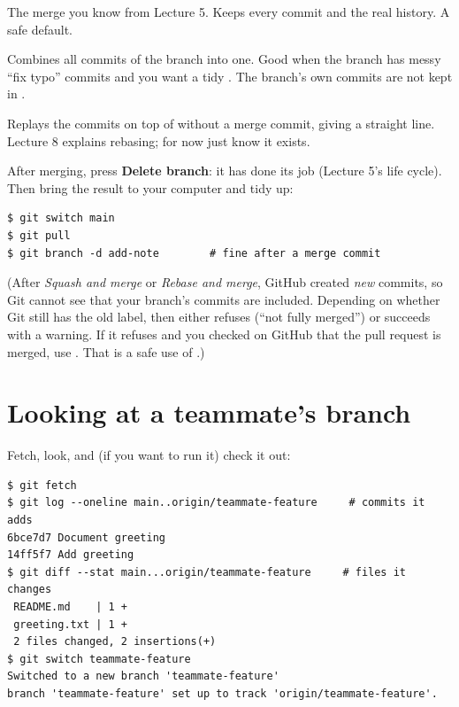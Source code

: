 \begin{description}[leftmargin=1.2em,style=nextline]
\item[Create a merge commit] The merge you know from Lecture 5. Keeps every commit and the real history. A safe default.
\item[Squash and merge] Combines all commits of the branch into one. Good when the branch has messy ``fix typo'' commits and you want a tidy . The branch's own commits are not kept in .
\item[Rebase and merge] Replays the commits on top of  without a merge commit, giving a straight line. Lecture 8 explains rebasing; for now just know it exists.
\end{description}

After merging, press \textbf{Delete branch}: it has done its job (Lecture 5's life cycle). Then bring the result to your computer and tidy up:

\begin{lstlisting}
$ git switch main
$ git pull
$ git branch -d add-note        # fine after a merge commit
\end{lstlisting}

(After \emph{Squash and merge} or \emph{Rebase and merge}, GitHub created \emph{new} commits, so Git cannot see that your branch's commits are included. Depending on whether Git still has the old  label,  then either refuses (``not fully merged'') or succeeds with a warning. If it refuses and you checked on GitHub that the pull request is merged, use . That is a safe use of .)

\section{Looking at a teammate's branch}\label{sec:teammate}

Fetch, look, and (if you want to run it) check it out:

\begin{lstlisting}
$ git fetch
$ git log --oneline main..origin/teammate-feature     # commits it adds
6bce7d7 Document greeting
14ff5f7 Add greeting
$ git diff --stat main...origin/teammate-feature     # files it changes
 README.md    | 1 +
 greeting.txt | 1 +
 2 files changed, 2 insertions(+)
$ git switch teammate-feature
Switched to a new branch 'teammate-feature'
branch 'teammate-feature' set up to track 'origin/teammate-feature'.
\end{lstlisting}

